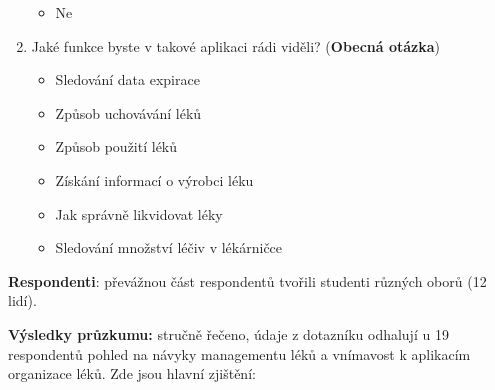 \documentclass[a4paper, 11pt]{article}
\begin{document}
\begin{enumerate}
\begin{itemize}
\item Ne
\end{itemize}
\item Jaké funkce byste v takové aplikaci rádi viděli? (\textbf{Obecná otázka})
\begin{itemize}
\item Sledování data expirace
\item Způsob uchovávání léků
\item Způsob použití léků
\item Získání informací o výrobci léku
\item Jak správně likvidovat léky
\item Sledování množství léčiv v lékárničce
\end{itemize}
\end{enumerate}

\textbf {Respondenti}: převážnou část respondentů tvořili studenti různých oborů (12 lidí).

\textbf {Výsledky průzkumu:} stručně řečeno, údaje z dotazníku odhalují u 19 respondentů pohled na návyky managementu léků a vnímavost k aplikacím organizace léků. Zde jsou hlavní zjištění:
\end{document}
